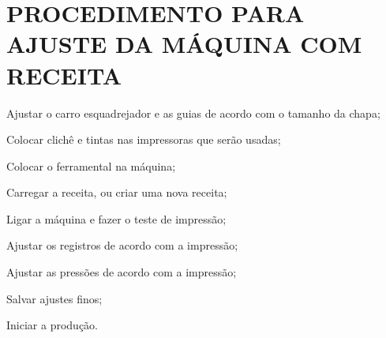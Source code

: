 \section{\large{PROCEDIMENTO PARA AJUSTE DA MÁQUINA COM RECEITA}}


\begin{procedureAdjustmentRecipe}
  
  \item Ajustar o carro esquadrejador e as guias de acordo com o tamanho da chapa;
  \item Colocar clichê e tintas nas impressoras que serão usadas;
  \item Colocar o ferramental na máquina;
  \item Carregar a receita, ou criar uma nova receita;
  \item Ligar a máquina e fazer o teste de impressão;
  \item Ajustar os registros de acordo com a impressão;
  \item Ajustar as pressões de acordo com a impressão;
  \item Salvar ajustes finos;
  \item Iniciar a produção.
  
\end{procedureAdjustmentRecipe}

